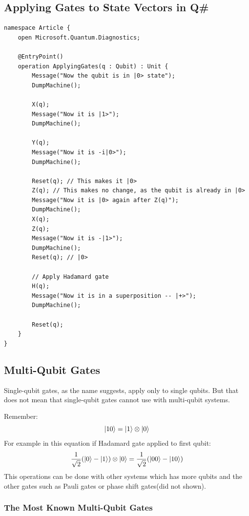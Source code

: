 \documentclass{article}
\begin{document}
\subsection{Applying Gates to State Vectors in Q\#}
\begin{verbatim}
namespace Article {
    open Microsoft.Quantum.Diagnostics;
    
    @EntryPoint()
    operation ApplyingGates(q : Qubit) : Unit {
        Message("Now the qubit is in |0> state");
        DumpMachine();

        X(q);
        Message("Now it is |1>");
        DumpMachine();

        Y(q);
        Message("Now it is -i|0>");
        DumpMachine();

        Reset(q); // This makes it |0>
        Z(q); // This makes no change, as the qubit is already in |0>
        Message("Now it is |0> again after Z(q)");
        DumpMachine();
        X(q);
        Z(q);
        Message("Now it is -|1>");
        DumpMachine();
        Reset(q); // |0>

        // Apply Hadamard gate
        H(q);
        Message("Now it is in a superposition -- |+>");
        DumpMachine();

        Reset(q);
    }
}

\end{verbatim}
\subsection{Multi-Qubit Gates}
Single-qubit gates, as the name suggests, apply only to single qubits. But that does not mean that single-qubit gates cannot use with multi-qubit systems. 

Remember:
\begin{equation*}
    \ket{10} = \ket{1} \otimes \ket{0}
\end{equation*}
For example in this equation if Hadamard gate applied to first qubit:
\begin{equation*}
    \frac{1}{\sqrt{2}}(\ket{0}-\ket{1}) \otimes \ket{0} = \frac{1}{\sqrt{2}}(\ket{00}-\ket{10})
\end{equation*}
This operations can be done with other systems which has more qubits and the other gates such as Pauli gates or phase shift gates(did not shown).
\subsubsection{The Most Known Multi-Qubit Gates}
\end{document}
